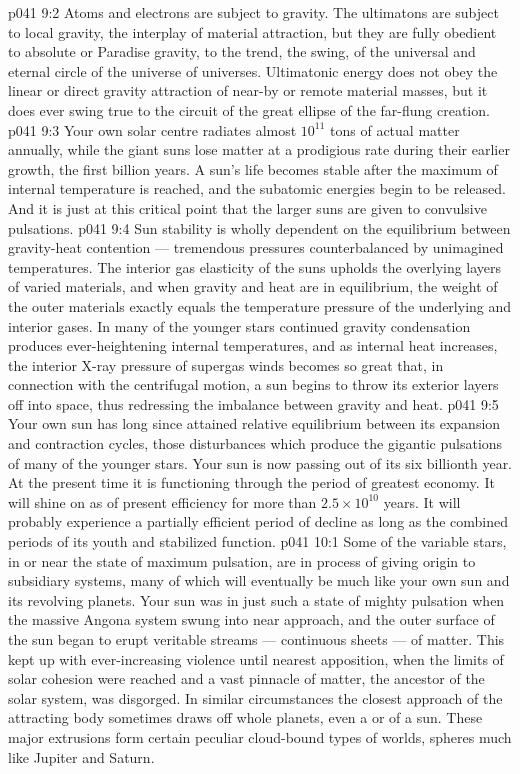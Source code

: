 \vs p041 9:2 \pc Atoms and electrons are subject to gravity. The ultimatons are  subject to local gravity, the interplay of material attraction, but they are fully obedient to absolute or Paradise gravity, to the trend, the swing, of the universal and eternal circle of the universe of universes. Ultimatonic energy does not obey the linear or direct gravity attraction of near\hyp{}by or remote material masses, but it does ever swing true to the circuit of the great ellipse of the far\hyp{}flung creation.
\vs p041 9:3 \pc Your own solar centre radiates almost $10^{11}$ tons of actual matter annually, while the giant suns lose matter at a prodigious rate during their earlier growth, the first billion years. A sun’s life becomes stable after the maximum of internal temperature is reached, and the subatomic energies begin to be released. And it is just at this critical point that the larger suns are given to convulsive pulsations.
\vs p041 9:4 Sun stability is wholly dependent on the equilibrium between gravity\hyp{}heat contention --- tremendous pressures counterbalanced by unimagined temperatures. The interior gas elasticity of the suns upholds the overlying layers of varied materials, and when gravity and heat are in equilibrium, the weight of the outer materials exactly equals the temperature pressure of the underlying and interior gases. In many of the younger stars continued gravity condensation produces ever\hyp{}heightening internal temperatures, and as internal heat increases, the interior X\hyp{}ray pressure of supergas winds becomes so great that, in connection with the centrifugal motion, a sun begins to throw its exterior layers off into space, thus redressing the imbalance between gravity and heat.
\vs p041 9:5 Your own sun has long since attained relative equilibrium between its expansion and contraction cycles, those disturbances which produce the gigantic pulsations of many of the younger stars. Your sun is now passing out of its six billionth year. At the present time it is functioning through the period of greatest economy. It will shine on as of present efficiency for more than $2.5 \times 10^{10}$ years. It will probably experience a partially efficient period of decline as long as the combined periods of its youth and stabilized function.
\vs p041 10:1 Some of the variable stars, in or near the state of maximum pulsation, are in process of giving origin to subsidiary systems, many of which will eventually be much like your own sun and its revolving planets. Your sun was in just such a state of mighty pulsation when the massive Angona system swung into near approach, and the outer surface of the sun began to erupt veritable streams --- continuous sheets --- of matter. This kept up with ever\hyp{}increasing violence until nearest apposition, when the limits of solar cohesion were reached and a vast pinnacle of matter, the ancestor of the solar system, was disgorged. In similar circumstances the closest approach of the attracting body sometimes draws off whole planets, even a  or  of a sun. These major extrusions form certain peculiar cloud\hyp{}bound types of worlds, spheres much like Jupiter and Saturn.
